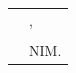 \par\vspace{0.55cm}

\begin{singlespace}
\begin{tabular}{p{7.5cm}l}
	&\city, \disahkantanggal\\[1.5cm]
	&\underline{\fullname} \\
	&NIM. \idnum
\end{tabular}
\end{singlespace}
